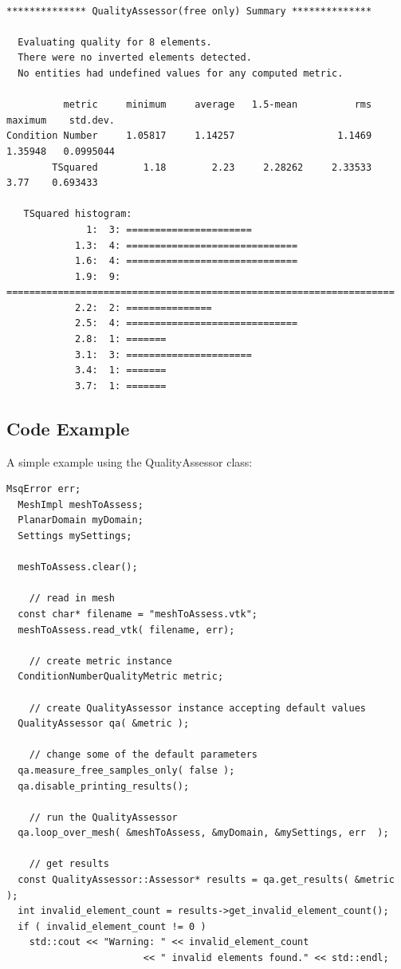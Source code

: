 \begin{verbatim}

************** QualityAssessor(free only) Summary **************

  Evaluating quality for 8 elements.
  There were no inverted elements detected. 
  No entities had undefined values for any computed metric.

          metric     minimum     average   1.5-mean          rms     maximum    std.dev.
Condition Number     1.05817     1.14257                  1.1469     1.35948   0.0995044
        TSquared        1.18        2.23     2.28262     2.33533        3.77    0.693433

   TSquared histogram:
              1:  3: ======================
            1.3:  4: ==============================
            1.6:  4: ==============================
            1.9:  9: ====================================================================
            2.2:  2: ===============
            2.5:  4: ==============================
            2.8:  1: =======
            3.1:  3: ======================
            3.4:  1: =======
            3.7:  1: =======

\end{verbatim}

\subsection{Code Example}

A simple example using the QualityAssessor class:
\begin{lstlisting}[frame=single]
  MsqError err;
  MeshImpl meshToAssess;
  PlanarDomain myDomain;
  Settings mySettings;

  meshToAssess.clear();

    // read in mesh
  const char* filename = "meshToAssess.vtk";
  meshToAssess.read_vtk( filename, err);

    // create metric instance
  ConditionNumberQualityMetric metric;

    // create QualityAssessor instance accepting default values
  QualityAssessor qa( &metric );

    // change some of the default parameters
  qa.measure_free_samples_only( false );
  qa.disable_printing_results();

    // run the QualityAssessor
  qa.loop_over_mesh( &meshToAssess, &myDomain, &mySettings, err  );

    // get results
  const QualityAssessor::Assessor* results = qa.get_results( &metric );
  int invalid_element_count = results->get_invalid_element_count();
  if ( invalid_element_count != 0 )
    std::cout << "Warning: " << invalid_element_count 
                        << " invalid elements found." << std::endl;
\end{lstlisting}

